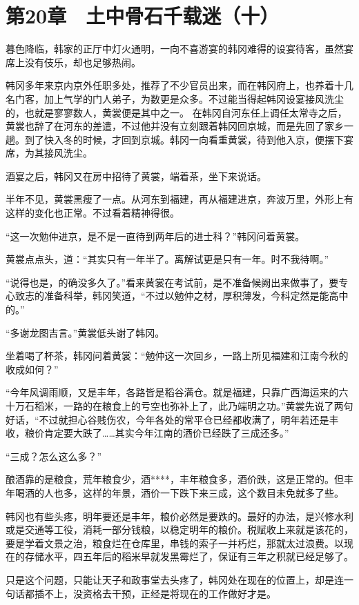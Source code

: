 \section{第20章　土中骨石千载迷（十）}
暮色降临，韩家的正厅中灯火通明，一向不喜游宴的韩冈难得的设宴待客，虽然宴席上没有伎乐，却也足够热闹。

韩冈多年来京内京外任职多处，推荐了不少官员出来，而在韩冈府上，也养着十几名门客，加上气学的门人弟子，为数更是众多。不过能当得起韩冈设宴接风洗尘的，也就是寥寥数人，黄裳便是其中之一。
在韩冈自河东任上调任太常寺之后，黄裳也辞了在河东的差遣，不过他并没有立刻跟着韩冈回京城，而是先回了家乡一趟。到了快入冬的时候，才回到京城。韩冈一向看重黄裳，待到他入京，便摆下宴席，为其接风洗尘。

酒宴之后，韩冈又在房中招待了黄裳，端着茶，坐下来说话。

半年不见，黄裳黑瘦了一点。从河东到福建，再从福建进京，奔波万里，外形上有这样的变化也正常。不过看着精神得很。

“这一次勉仲进京，是不是一直待到两年后的进士科？”韩冈问着黄裳。

黄裳点点头，道：“其实只有一年半了。离解试更是只有一年。时不我待啊。”

“说得也是，的确没多久了。”看来黄裳在考试前，是不准备候阙出来做事了，要专心致志的准备科举，韩冈笑道，“不过以勉仲之材，厚积薄发，今科定然是能高中的。”

“多谢龙图吉言。”黄裳低头谢了韩冈。

坐着喝了杯茶，韩冈问着黄裳：“勉仲这一次回乡，一路上所见福建和江南今秋的收成如何？”

“今年风调雨顺，又是丰年，各路皆是稻谷满仓。就是福建，只靠广西海运来的六十万石稻米，一路的在粮食上的亏空也弥补上了，此乃端明之功。”黄裳先说了两句好话，“不过就担心谷贱伤农，今年各处的常平仓已经都收满了，明年若还是丰收，粮价肯定要大跌了……其实今年江南的酒价已经跌了三成还多。”

“三成？怎么这么多？”

酿酒靠的是粮食，荒年粮食少，酒****，丰年粮食多，酒价跌，这是正常的。但丰年喝酒的人也多，这样的年景，酒价一下跌下来三成，这个数目未免就多了些。

韩冈也有些头疼，明年要还是丰年，粮价必然是要跌的。最好的办法，是兴修水利或是交通等工役，消耗一部分钱粮，以稳定明年的粮价。税赋收上来就是该花的，要是学着文景之治，粮食烂在仓库里，串钱的索子一并朽烂，那就太过浪费。以现在的存储水平，四五年后的稻米早就发黑霉烂了，保证有三年之积就已经足够了。

只是这个问题，只能让天子和政事堂去头疼了，韩冈处在现在的位置上，却是连一句话都插不上，没资格去干预，正经是将现在的工作做好才是。

